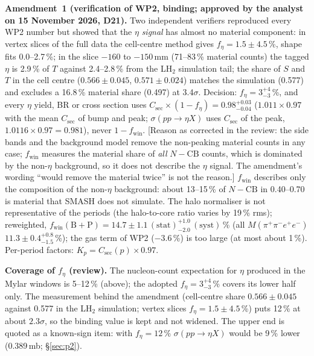 \documentclass[11pt,a4paper]{article}
\newcommand{\Mfour}{\ensuremath{M(\pi^{+}\pi^{-}e^{+}e^{-})}\xspace}
\newcommand{\Csec}{\ensuremath{C_{\mathrm{sec}}}\xspace}
\newcommand{\feta}{\ensuremath{f_\eta}\xspace}
\newcommand{\fwin}{\ensuremath{f_{\mathrm{win}}}\xspace}
\newcommand{\sigeta}{\ensuremath{\sigma(pp\to\eta X)}\xspace}
\newcommand{\notebox}[1]{\par\noindent\colorbox{orange!10}{\parbox{\dimexpr\linewidth-2\fboxsep\relax}{#1}}\par}
\begin{document}
\notebox{\textbf{Amendment~1 (verification of WP2, binding; approved by the analyst on 15 November 2026, D21).} Two independent verifiers reproduced every WP2 number but showed that the
$\eta$ \emph{signal} has almost no material component: in vertex slices of the full data the cell-centre method gives $\feta=1.5\pm4.5$\,\%,
shape fits 0.0--2.7\,\%; in the slice $-160$ to $-150$\,mm (71--83\,\% material counts) the tagged $\eta$ is 2.9\,\% of $T$ against 2.4--2.8\,\%
from the LH$_2$ simulation tail; the share of $S$ and $T$ in the cell centre ($0.566\pm0.045$, $0.571\pm0.024$) matches the simulation (0.577)
and excludes a 16.8\,\% material share (0.497) at 3.4$\sigma$. Decision: $\feta=3^{+4}_{-3}$\,\%, and every $\eta$ yield, BR or cross section
uses $\Csec\times(1-\feta)=0.98^{+0.03}_{-0.04}$ ($1.011\times0.97$ with the mean \Csec of bump and peak; \sigeta uses \Csec of the peak,
$1.0116\times0.97=0.981$), never $1-\fwin$. [Reason as corrected in the review: the side bands and the
background model remove the non-peaking material counts in any case; \fwin measures the material share of \emph{all} $N-\mathrm{CB}$ counts,
which is dominated by the non-$\eta$ background, so it does not describe the $\eta$ signal. The amendment's wording ``would remove the
material twice'' is not the reason.] \fwin describes only the composition of the non-$\eta$ background: about
13--15\,\% of $N-\mathrm{CB}$ in 0.40--0.70 is material that SMASH does not simulate. The halo normaliser is not representative of the periods
(the halo-to-core ratio varies by 19\,\% rms); reweighted, $\fwin(\mathrm{B+P})=14.7\pm1.1\,(\mathrm{stat})^{+1.0}_{-2.0}\,(\mathrm{syst})$\,\%
(all \Mfour $11.3\pm0.4^{+0.8}_{-1.5}$\,\%); the gas term of WP2 ($-3.6$\,\%) is too large (at most about 1\,\%). Per-period factors:
$K_p=\Csec(p)\times0.97$.}

\textbf{Coverage of $\feta$ (review).} The nucleon-count expectation for $\eta$ produced in the Mylar windows is 5--12\,\% (above); the
adopted $\feta=3^{+4}_{-3}$\,\% covers its lower half only. The measurement behind the amendment (cell-centre share $0.566\pm0.045$ against
0.577 in the LH$_2$ simulation; vertex slices $\feta=1.5\pm4.5$\,\%) puts 12\,\% at about $2.3\sigma$, so the binding value is
kept and not widened. The upper end is quoted as a known-sign item: with $\feta=12$\,\% \sigeta would be
9\,\% lower (0.389\,mb; \S\ref{sec:p2}).
\end{document}
